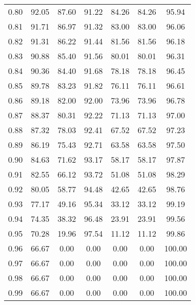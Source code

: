 \begin{tabular}{|c|c|c|c|c|c|c|}
      0.80 &     92.05 &     87.60 &      91.22 &   84.26 &      84.26 &         95.94 \\
      0.81 &     91.71 &     86.97 &      91.32 &   83.00 &      83.00 &         96.06 \\
      0.82 &     91.31 &     86.22 &      91.44 &   81.56 &      81.56 &         96.18 \\
      0.83 &     90.88 &     85.40 &      91.56 &   80.01 &      80.01 &         96.31 \\
      0.84 &     90.36 &     84.40 &      91.68 &   78.18 &      78.18 &         96.45 \\
      0.85 &     89.78 &     83.23 &      91.82 &   76.11 &      76.11 &         96.61 \\
      0.86 &     89.18 &     82.00 &      92.00 &   73.96 &      73.96 &         96.78 \\
      0.87 &     88.37 &     80.31 &      92.22 &   71.13 &      71.13 &         97.00 \\
      0.88 &     87.32 &     78.03 &      92.41 &   67.52 &      67.52 &         97.23 \\
      0.89 &     86.19 &     75.43 &      92.71 &   63.58 &      63.58 &         97.50 \\
      0.90 &     84.63 &     71.62 &      93.17 &   58.17 &      58.17 &         97.87 \\
      0.91 &     82.55 &     66.12 &      93.72 &   51.08 &      51.08 &         98.29 \\
      0.92 &     80.05 &     58.77 &      94.48 &   42.65 &      42.65 &         98.76 \\
      0.93 &     77.17 &     49.16 &      95.34 &   33.12 &      33.12 &         99.19 \\
      0.94 &     74.35 &     38.32 &      96.48 &   23.91 &      23.91 &         99.56 \\
      0.95 &     70.28 &     19.96 &      97.54 &   11.12 &      11.12 &         99.86 \\
      0.96 &     66.67 &      0.00 &       0.00 &    0.00 &       0.00 &        100.00 \\
      0.97 &     66.67 &      0.00 &       0.00 &    0.00 &       0.00 &        100.00 \\
      0.98 &     66.67 &      0.00 &       0.00 &    0.00 &       0.00 &        100.00 \\
      0.99 &     66.67 &      0.00 &       0.00 &    0.00 &       0.00 &        100.00 \\
\bottomrule
\end{tabular}
